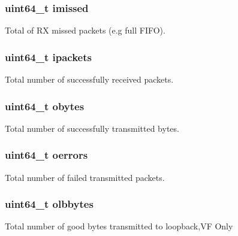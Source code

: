 \subsubsection[{imissed}]{\setlength{\rightskip}{0pt plus 5cm}uint64\+\_\+t imissed}\label{structrte__eth__stats_a462703bfeca72b2d1039f588d8ddbf3c}
Total of R\+X missed packets (e.\+g full F\+I\+F\+O). \hypertarget{structrte__eth__stats_ac14b69830000494630c8897b70c5fc54}{}
\subsubsection[{ipackets}]{\setlength{\rightskip}{0pt plus 5cm}uint64\+\_\+t ipackets}\label{structrte__eth__stats_ac14b69830000494630c8897b70c5fc54}
Total number of successfully received packets. \hypertarget{structrte__eth__stats_a4874ce812696c16cf79997be5cd7ef1a}{}
\subsubsection[{obytes}]{\setlength{\rightskip}{0pt plus 5cm}uint64\+\_\+t obytes}\label{structrte__eth__stats_a4874ce812696c16cf79997be5cd7ef1a}
Total number of successfully transmitted bytes. \hypertarget{structrte__eth__stats_aef4fb99e61e169cf6fc62b61f5bd5035}{}
\subsubsection[{oerrors}]{\setlength{\rightskip}{0pt plus 5cm}uint64\+\_\+t oerrors}\label{structrte__eth__stats_aef4fb99e61e169cf6fc62b61f5bd5035}
Total number of failed transmitted packets. \hypertarget{structrte__eth__stats_ae27a2b477810d5cccd3f1ebf092548b7}{}
\subsubsection[{olbbytes}]{\setlength{\rightskip}{0pt plus 5cm}uint64\+\_\+t olbbytes}\label{structrte__eth__stats_ae27a2b477810d5cccd3f1ebf092548b7}
Total number of good bytes transmitted to loopback,V\+F Only \hypertarget{structrte__eth__stats_a7c29127c73fd1f620335984959f7deff}{}
